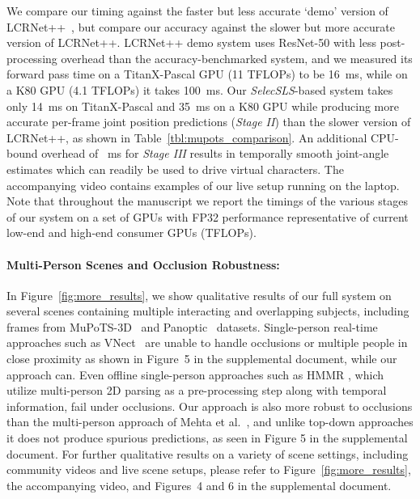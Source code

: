 \documentclass[acmtog,authorversion]{acmart}
\begin{document}
We compare our timing against the faster but less accurate `demo' version of LCRNet++~, but compare our accuracy against the slower but more accurate version of LCRNet++.
LCRNet++ demo system uses ResNet-50 with less post-processing overhead than the accuracy-benchmarked system, and we measured its forward pass time on a TitanX-Pascal GPU (11 TFLOPs) to be 16~ms, while on a K80 GPU (4.1 TFLOPs) it takes 100~ms.
Our \textit{SelecSLS}-based system takes only 14~ms on TitanX-Pascal and 35~ms on a K80 GPU while producing more accurate per-frame joint position predictions (\textit{Stage II}) than the slower version of LCRNet++, as shown in Table~\ref{tbl:mupots_comparison}. An additional CPU-bound overhead of ~ms for \textit{Stage III} results in temporally smooth joint-angle estimates which can readily be used to drive virtual characters.
The accompanying video contains examples of our live setup running on the laptop. 
Note that throughout the manuscript we report the timings of the various stages of our system on a set of GPUs with FP32 performance representative of current low-end and high-end consumer GPUs (TFLOPs).

\paragraph{Multi-Person Scenes and Occlusion Robustness:}
In Figure~\ref{fig:more_results}, we show qualitative results of our full system on several scenes containing multiple interacting and overlapping subjects, including frames from MuPoTS-3D~ and Panoptic~ datasets. Single-person real-time approaches such as VNect~ are unable to handle occlusions or multiple people in close proximity as shown in Figure~5 in the supplemental document, while our approach can. Even offline single-person approaches such as HMMR , which utilize multi-person 2D parsing as a pre-processing step along with temporal information, fail under occlusions. Our approach is also more robust to occlusions than the multi-person approach of Mehta et al.~, and unlike top-down approaches \citep{rogez_lcrpp,Moon_2019_ICCV_3DMPPE,dabral2019multi} it does not produce spurious predictions, as seen in Figure 5 in the supplemental document.
For further qualitative results on a variety of scene settings, including community videos and live scene setups, please refer to Figure~\ref{fig:more_results}, the accompanying video, and Figures~4 and 6 in the supplemental document.
\end{document}
